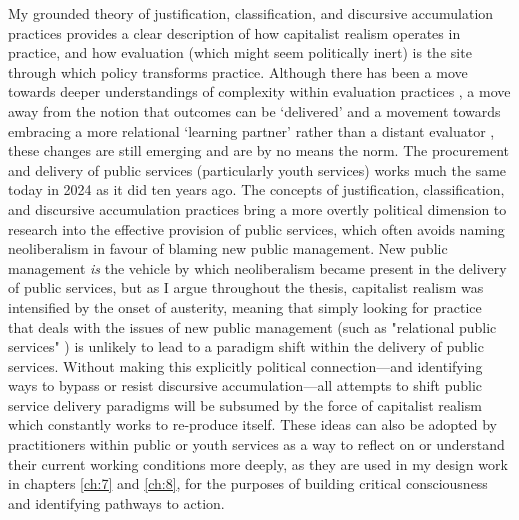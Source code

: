 My grounded theory of justification, classification, and discursive accumulation practices provides a clear description of how capitalist realism operates in practice, and how evaluation (which might seem politically inert) is the site through which policy transforms practice. Although there has been a move towards deeper understandings of complexity within evaluation practices \citep{douthwaite_towards_2017}, a move away from the notion that outcomes can be `delivered' \citep[p. 983]{lowe_playing_2017}  and a movement towards embracing a more relational `learning partner' rather than a distant evaluator \citep{hesselgreaves_new_2021}, these changes are still emerging and are by no means the norm. The procurement and delivery of public services (particularly youth services) works much the same today in 2024 as it did ten years ago. The concepts of justification, classification, and discursive accumulation practices bring a more overtly political dimension to research into the effective provision of public services, which often avoids naming neoliberalism in favour of blaming new public management. New public management \emph{is} the vehicle by which neoliberalism became present in the delivery of public services, but as I argue throughout the thesis, capitalist realism was intensified by the onset of austerity, meaning that simply looking for practice that deals with the issues of new public management (such as "relational public services" \citep{olivier_digital_2015,wilson_new_2024}) is unlikely to lead to a paradigm shift within the delivery of public services. Without making this explicitly political connection—and identifying ways to bypass or resist discursive accumulation—all attempts to shift public service delivery paradigms will be subsumed by the force of capitalist realism which constantly works to re-produce itself.  These ideas can also be adopted by practitioners within public or youth services as a way to reflect on or understand their current working conditions more deeply, as they are used in my design work in chapters \ref{ch:7} and \ref{ch:8}, for the purposes of building critical consciousness and identifying pathways to action.

